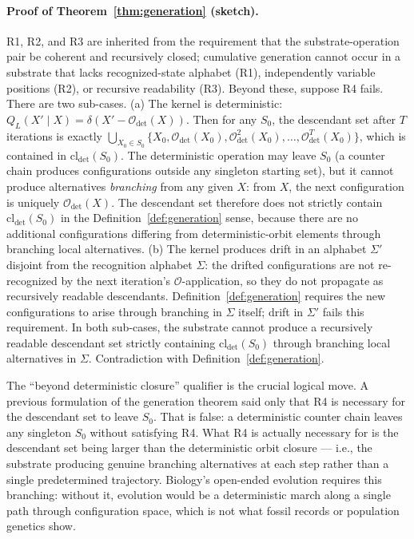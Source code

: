 \documentclass[aps,prx,reprint,amsmath,amssymb,floatfix,superscriptaddress,nofootinbib]{revtex4-2}
\theoremstyle{plain-thm}
\theoremstyle{definition-thm}
\newcommand{\Op}{\mathcal{O}}
\begin{document}
\paragraph{Proof of Theorem~\ref{thm:generation} (sketch).} R1, R2, and R3 are inherited from the requirement that the substrate-operation pair be coherent and recursively closed; cumulative generation cannot occur in a substrate that lacks recognized-state alphabet (R1), independently variable positions (R2), or recursive readability (R3). Beyond these, suppose R4 fails. There are two sub-cases. (a) The kernel is deterministic: $Q_L(X' \mid X) = \delta(X' - \Op_{\det}(X))$. Then for any $S_0$, the descendant set after $T$ iterations is exactly $\bigcup_{X_0 \in S_0} \{X_0, \Op_{\det}(X_0), \Op_{\det}^2(X_0), \ldots, \Op_{\det}^T(X_0)\}$, which is contained in $\mathrm{cl}_{\det}(S_0)$. The deterministic operation may leave $S_0$ (a counter chain produces configurations outside any singleton starting set), but it cannot produce alternatives \emph{branching} from any given $X$: from $X$, the next configuration is uniquely $\Op_{\det}(X)$. The descendant set therefore does not strictly contain $\mathrm{cl}_{\det}(S_0)$ in the Definition~\ref{def:generation} sense, because there are no additional configurations differing from deterministic-orbit elements through branching local alternatives. (b) The kernel produces drift in an alphabet $\Sigma'$ disjoint from the recognition alphabet $\Sigma$: the drifted configurations are not re-recognized by the next iteration's $\Op$-application, so they do not propagate as recursively readable descendants. Definition~\ref{def:generation} requires the new configurations to arise through branching in $\Sigma$ itself; drift in $\Sigma'$ fails this requirement. In both sub-cases, the substrate cannot produce a recursively readable descendant set strictly containing $\mathrm{cl}_{\det}(S_0)$ through branching local alternatives in $\Sigma$. Contradiction with Definition~\ref{def:generation}.

The ``beyond deterministic closure'' qualifier is the crucial logical move. A previous formulation of the generation theorem said only that R4 is necessary for the descendant set to leave $S_0$. That is false: a deterministic counter chain leaves any singleton $S_0$ without satisfying R4. What R4 is actually necessary for is the descendant set being larger than the deterministic orbit closure --- i.e., the substrate producing genuine branching alternatives at each step rather than a single predetermined trajectory. Biology's open-ended evolution requires this branching: without it, evolution would be a deterministic march along a single path through configuration space, which is not what fossil records or population genetics show.
\end{document}
